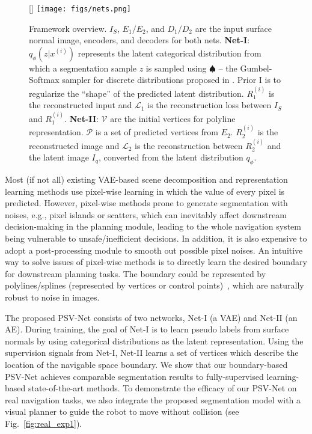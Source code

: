 \documentclass[letterpaper, 10 pt, journal, twoside]{ieeetran}
\begin{document}
\begin{figure*} [t] \vspace{8pt}
[\FBwidth]
{\label{fig:turbine1}\texttt{[image: figs/nets.png]}}
{\caption{\small  
Framework overview. $I_{S}$, $E_1/E_2$, and $D_1/D_2$ are the input surface normal image, encoders, and decoders for both nets. \textbf{Net-I}: $q_{\phi}(z|x^{(i)})$ represents the latent categorical distribution from which a segmentation sample $z$ is sampled using $\spadesuit$ -- the Gumbel-Softmax sampler for discrete distributions proposed in \cite{jang2016categorical}. Prior I is to regularize the ``shape'' of the predicted latent distribution. $R_1^{(i)}$ is the reconstructed input and $\mathcal{L}_{1}$ is the reconstruction loss between $I_{S}$ and $R_1^{(i)}$. \textbf{Net-II}: $\mathcal{V}$ are the initial vertices for polyline representation. $\mathcal{P}$ is a set of predicted vertices from $E_2$. $R_2^{(i)}$ is the reconstructed image and $\mathcal{L}_{2}$ is the reconstruction between $R_2^{(i)}$ and the latent image $I_q$, converted from the latent distribution $q_{\phi}$.
} 
\label{fig:nets}
} \vspace{-15pt}
\end{figure*} 

Most (if not all) existing VAE-based scene decomposition and representation learning methods use pixel-wise learning in which the value of every pixel is predicted. 
However, pixel-wise methods prone to generate segmentation with noises, e.g., pixel islands or scatters, which can inevitably affect downstream decision-making in the planning module, leading to the whole navigation system being vulnerable to unsafe/inefficient decisions. In addition, it is also expensive to adopt a post-processing module to smooth out possible pixel noises. An intuitive way to solve issues of pixel-wise methods is to directly learn the desired boundary for downstream planning tasks. The boundary could be represented by polylines/splines (represented by vertices or control points)~\cite{wang2019object,peng2020deep}, which are naturally robust to  noise in images. 

The proposed PSV-Net consists of two networks, Net-I (a VAE) and Net-II (an AE). During training, the goal of Net-I is to learn pseudo labels from surface normals by using categorical distributions as the latent representation. Using the supervision signals from  Net-I,    Net-II learns a set of vertices which describe the location of the navigable space boundary. We  show that our boundary-based PSV-Net  achieves comparable segmentation results to  fully-supervised learning-based state-of-the-art methods. To demonstrate the  efficacy of our PSV-Net on real navigation tasks, we also integrate the proposed segmentation model with a visual planner to guide the robot to move without collision (see Fig.~\ref{fig:real_exp1}).
\end{document}
